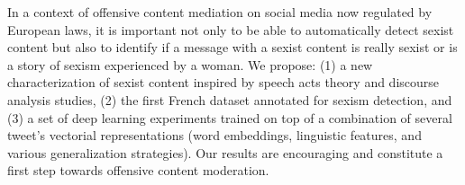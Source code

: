 In a context of offensive content mediation on social media now regulated by European laws,  it is important not only to be able to automatically detect sexist content but also to identify if a message with a sexist content is really sexist or is a story of sexism experienced by a woman. We propose: (1) a new characterization of sexist content inspired by speech acts theory and discourse  analysis  studies, (2) the  first  French  dataset  annotated for sexism detection, and (3) a set of deep learning experiments  trained on top of a combination of several tweet's vectorial representations (word embeddings, linguistic features, and various generalization strategies). Our results are encouraging and constitute a first step towards offensive content moderation.
